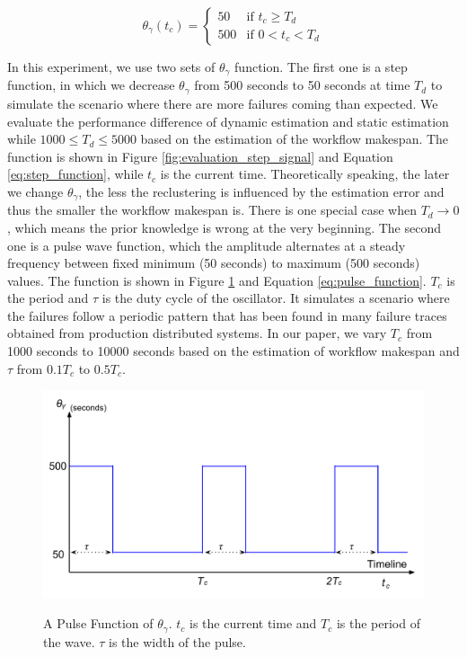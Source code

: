 \documentclass{IOS-Book-Article}
\begin{document}
\begin{equation}
\label{eq:step_function}
 \theta_{\gamma}(t_c) =
  \begin{cases}
   50 & \text{if } t_c \geq T_d \\
   500       & \text{if } 0< t_c < T_d
  \end{cases}
\end{equation}

In this experiment, we use two sets of $\theta_{\gamma}$ function. The first one is a step function, in which we decrease $\theta_{\gamma}$ from 500 seconds to 50 seconds at time $T_d$ to simulate the scenario where there are more failures coming than expected. We evaluate the performance difference of dynamic estimation and static estimation while $1000\leq T_d\leq 5000$ based on the estimation of the workflow makespan. The function is shown  in Figure \ref{fig:evaluation_step_signal} and Equation \ref{eq:step_function}, while $t_c$ is the current time. Theoretically speaking, the later we change $\theta_{\gamma}$, the less the reclustering is influenced by the estimation error and thus the smaller the workflow makespan is. There is one special case when $T_d\to 0$, which means the prior knowledge is wrong at the very beginning. The second one is a pulse wave function, which the amplitude alternates at a steady frequency between fixed minimum (50 seconds) to maximum (500 seconds) values. The function is shown in Figure \ref{fig:evaluation_pulse_signal} and Equation \ref{eq:pulse_function}. $T_c$ is the period and $\tau$ is the duty cycle of the oscillator. It simulates a scenario where the failures follow a periodic pattern \cite{yigitbasi2010analysis} that has been found in many failure traces obtained from production distributed systems. In our paper, we vary $T_c$ from 1000 seconds to 10000 seconds based on the estimation of workflow makespan and $\tau$ from $0.1T_c$ to $0.5T_c$. 


\begin{figure}[htb]
	\centering
	\includegraphics[width=0.8\linewidth]{pulse_signal.pdf} \\
	\caption{A Pulse Function of $\theta_{\gamma}$. $t_c$ is the current time and $T_c$ is the period of the wave. $\tau$ is the width of the pulse. }
	\label{fig:evaluation_pulse_signal}
\end{figure}
\end{document}
